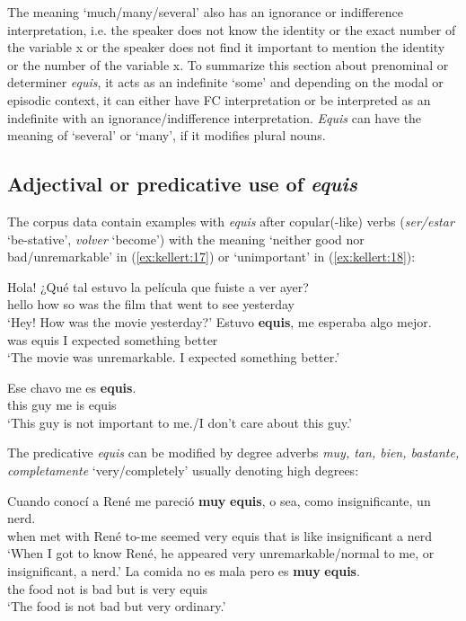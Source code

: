 \documentclass[output=paper]{langsci/langscibook}
\begin{document}
The meaning ‘much/many/several’ also has an ignorance or indifference interpretation, i.e. the speaker does not know the identity or the exact number of the variable x or the speaker does not find it important to mention the identity or the number of the variable x.
To summarize this section about prenominal or determiner \textit{equis}, it acts as an indefinite ‘some’ and depending on the modal or episodic context, it can either have FC interpretation or be interpreted as an indefinite with an ignorance/indifference interpretation. \textit{Equis} can have the meaning of ‘several’ or ‘many’, if it modifies plural nouns.

\subsection{Adjectival or predicative use of \textit{equis}}\label{sec:kellert:2.2}
The corpus data contain examples with \textit{equis} after copular(-like) verbs (\textit{ser\slash estar} ‘be-stative’, \textit{volver} ‘become’) with the meaning ‘neither good nor bad\slash unremark\-able’ in (\ref{ex:kellert:17}) or ‘unimportant’ in (\ref{ex:kellert:18}):

\ea\label{ex:kellert:17}
\begin{xlist}
Hola! {¿}Qué tal estuvo la película que fuiste a ver ayer?\\
hello how so was the film that went to see yesterday\\
\glt `Hey! How was the movie yesterday?'
\gll  Estuvo \textbf{equis}, me esperaba algo mejor.\\
was equis I expected something better\\
\glt `The movie was unremarkable. I expected something better.’
\end{xlist}
\ex \label{ex:kellert:18}
\gll  Ese chavo me es \textbf{equis}.\\
this guy me is equis\\
\glt ‘This guy is not important to me./I don’t care about this guy.’
\z

The predicative \textit{equis} can be modified by degree adverbs \textit{muy, tan, bien, bastante, completamente} ‘very/completely’ usually denoting high degrees:

\ea\label{ex:kellert:19}
\gll Cuando conocí a René me pareció \textbf{muy} \textbf{equis}, o sea, como insignificante, un nerd.\\
when met with René to-me seemed very equis that is like insignificant a nerd\\
\glt ‘When I got to know René, he appeared very unremarkable/normal to me, or insignificant, a nerd.’
\ex 
\gll La comida no es mala pero es \textbf{muy} \textbf{equis}.\\
the food not is bad but is very equis\\
\glt ‘The food is not bad but very ordinary.’
\z
\end{document}
